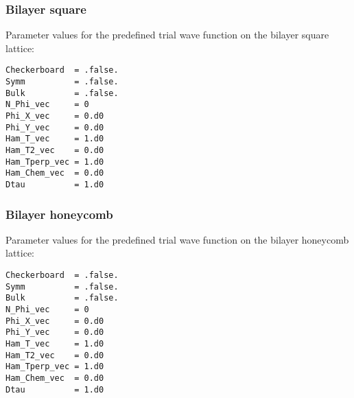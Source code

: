 \subsubsection{Bilayer square}

Parameter values for the predefined trial wave function on the bilayer square lattice:
\begin{lstlisting}[style=fortran]
Checkerboard  = .false.
Symm          = .false.
Bulk          = .false.
N_Phi_vec     = 0
Phi_X_vec     = 0.d0
Phi_Y_vec     = 0.d0
Ham_T_vec     = 1.d0
Ham_T2_vec    = 0.d0
Ham_Tperp_vec = 1.d0
Ham_Chem_vec  = 0.d0
Dtau          = 1.d0
\end{lstlisting}


\subsubsection{Bilayer honeycomb}

Parameter values for the predefined trial wave function on the bilayer honeycomb lattice:
\begin{lstlisting}[style=fortran]
Checkerboard  = .false.
Symm          = .false.
Bulk          = .false.
N_Phi_vec     = 0
Phi_X_vec     = 0.d0
Phi_Y_vec     = 0.d0
Ham_T_vec     = 1.d0
Ham_T2_vec    = 0.d0
Ham_Tperp_vec = 1.d0
Ham_Chem_vec  = 0.d0
Dtau          = 1.d0
\end{lstlisting}

